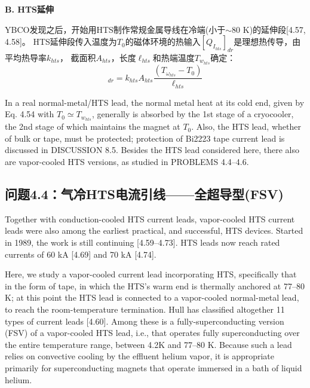 \textbf{B. HTS延伸}

YBCO发现之后，开始用HTS制作常规金属导线在冷端(小于$\sim$80 K)的延伸段[4.57, 4.58]。
HTS延伸段传入温度为$T_0$的磁体环境的热输入$[Q_{I_{hts}}]_{dr}$是理想热传导，由平均热导率$k_{hts}$，
截面积$A_{hts}$，长度$\ell_{hts}$和热端温度$T_{w_{hts}}$确定：
\begin{equation}%
[Q_{I_hts}]_{dr}=k_{hts}A_{hts}\frac{(T_{\omega_{hts}}-T_0)}{\ell_{hts}}
\end{equation}

In a real normal-metal/HTS lead, the normal metal heat at its cold end, given by
Eq. 4.54 with $T_0\simeq T_{w_{hts}}$, generally is absorbed by the 1st stage of a cryocooler,
the 2nd stage of which maintains the magnet at $T_0$. Also, the HTS lead, whether
of bulk or tape, must be protected; protection of Bi2223 tape current lead is
discussed in DISCUSSION 8.5. Besides the HTS lead considered here, there also
are vapor-cooled HTS versions, as studied in PROBLEMS 4.4–4.6.


\subsection{问题4.4：气冷HTS电流引线——全超导型(FSV)}

Together with conduction-cooled HTS current leads, vapor-cooled HTS current
leads were also among the earliest practical, and successful, HTS devices. Started
in 1989, the work is still continuing [4.59–4.73]. HTS leads now reach rated currents
of 60 kA [4.69] and 70 kA [4.74].

Here, we study a vapor-cooled current lead incorporating HTS, specifically that in
the form of tape, in which the HTS’s warm end is thermally anchored at 77–80 K;
at this point the HTS lead is connected to a vapor-cooled normal-metal lead, to
reach the room-temperature termination. Hull has classified altogether 11 types
of current leads [4.60]. Among these is a fully-superconducting version (FSV) of
a vapor-cooled HTS lead, i.e., that operates fully superconducting over the entire
temperature range, between 4.2K and 77–80 K. Because such a lead relies on
convective cooling by the effluent helium vapor, it is appropriate primarily for
superconducting magnets that operate immersed in a bath of liquid helium.

